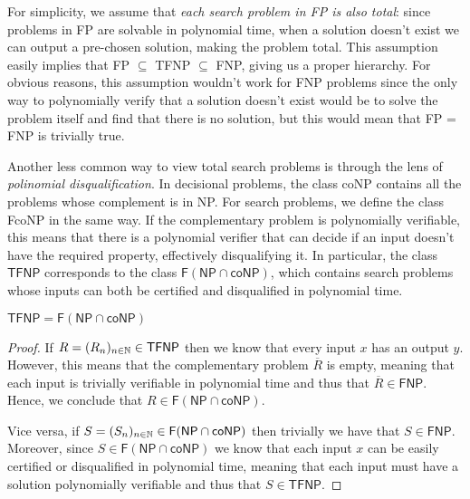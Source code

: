 For simplicity, we assume that \textit{each search problem in \textsf{FP} is also total}: since problems in \textsf{FP} are solvable in polynomial time, when a solution doesn't exist we can output a pre-chosen  solution, making the problem total. This assumption easily implies that \textsf{FP} $\subseteq$ \textsf{TFNP} $\subseteq$ \textsf{FNP}, giving us a proper hierarchy. For obvious reasons, this assumption wouldn't work for \textsf{FNP} problems since the only way to polynomially verify that a solution doesn't exist would be to solve the problem itself and find that there is no solution, but this would mean that \textsf{FP} = \textsf{FNP} is trivially true.

Another less common way to view total search problems is through the lens of \textit{polinomial disqualification}. In decisional problems, the class \textsf{coNP} contains all the problems whose complement is in \textsf{NP}. For search problems, we define the class \textsf{FcoNP} in the same way. If the complementary problem is polynomially verifiable, this means that there is a polynomial verifier that can decide if an input doesn't have the required property, effectively disqualifying it. In particular, the class $\textsf{TFNP}$ corresponds to the class $\mathsf{F}(\mathsf{NP} \cap \mathsf{coNP})$, which contains search problems whose inputs can both be certified and disqualified in polynomial time.

\begin{theorem}
    \label{tfnp_f_np_conp}
    $\mathsf{TFNP} = \mathsf{F}(\mathsf{NP} \cap \mathsf{coNP})$
\end{theorem}

\begin{proof}
    If $R = (R_n)_{n \in \mathbb{N}} \in \textsf{TFNP}$ then we know that every input $x$ has an output $y$. However, this means that the complementary problem $\overline{R}$ is empty, meaning that each input is trivially verifiable in polynomial time and thus that $\overline{R} \in \textsf{FNP}$. Hence, we conclude that $R \in \mathsf{F}(\mathsf{NP} \cap \mathsf{coNP})$.
    
    Vice versa, if $S = (S_n)_{n \in \mathbb{N}} \in \mathsf{F}(\mathsf{NP} \cap \mathsf{coNP})$ then trivially we have that $S \in \mathsf{FNP}$. Moreover, since $S \in \mathsf{F}(\mathsf{NP} \cap \mathsf{coNP})$ we know that each input $x$ can be easily certified or disqualified in polynomial time, meaning that each input must have a solution polynomially verifiable and thus that $S \in \mathsf{TFNP}$.
\end{proof}

